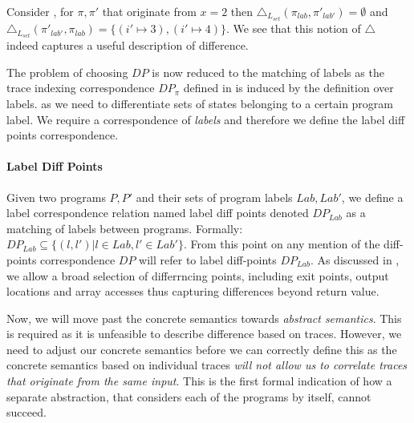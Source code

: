 
\begin{Example}
Consider , for $\pi, \pi'$ that originate from $x=2$  then $\triangle_{L_{set}}(\pi_{lab},\pi'_{lab'}) = \emptyset$ and $\triangle_{L_{set}}(\pi'_{lab'},\pi_{lab}) = \{ (i' \mapsto 3),(i' \mapsto 4) \}$. We see that this notion of $\triangle$ indeed captures a useful description of difference.
\end{Example}

The problem of choosing $DP$ is now reduced to the matching of labels as the trace indexing correspondence $DP_{\pi}$ defined in  is induced by the definition over labels. as we need to differentiate sets of states belonging to a certain program label. We require a correspondence of \emph{labels} and therefore we define the label diff points correspondence.

\paragraph{Label Diff Points} 
Given two programs $P,P'$ and their sets of program labels $Lab,Lab'$, we define a label correspondence relation named label diff points denoted $DP_{Lab}$ as a matching of labels between programs. Formally: $DP_{Lab} \subseteq \{(l,l')|l \in Lab, l' \in Lab'\}$. From this point on any mention of the diff-points correspondence $DP$ will refer to label diff-points $DP_{Lab}$. As discussed in , we allow a broad selection of differrncing points, including exit points, output locations and array accesses thus capturing differences beyond return value. %

Now, we will move past the concrete semantics towards \emph{abstract semantics}. This is required as it is unfeasible to describe difference based on traces. However, we need to adjust our concrete semantics before we can correctly define this as the concrete semantics based on individual traces \emph{will not allow us to correlate traces that originate from the same input}. This is the first formal indication of how a separate abstraction, that considers each of the programs by itself, cannot succeed.

